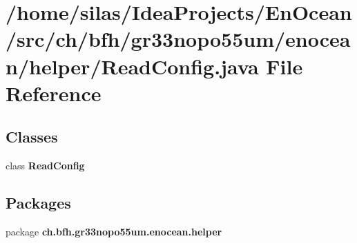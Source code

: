 \section{/home/silas/\+Idea\+Projects/\+En\+Ocean/src/ch/bfh/gr33nopo55um/enocean/helper/\+Read\+Config.java File Reference}
\label{ReadConfig_8java}
\subsection*{Classes}
\begin{DoxyCompactItemize}
\item 
class {\bf Read\+Config}
\end{DoxyCompactItemize}
\subsection*{Packages}
\begin{DoxyCompactItemize}
\item 
package {\bf ch.\+bfh.\+gr33nopo55um.\+enocean.\+helper}
\end{DoxyCompactItemize}
